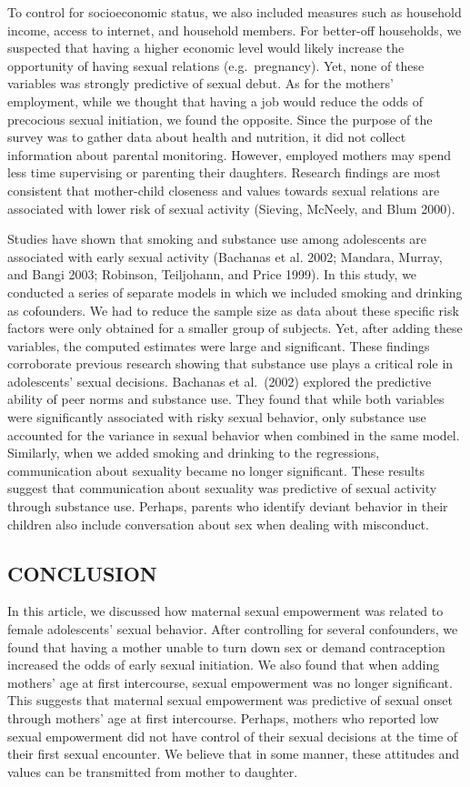 \documentclass[
]{article}
\begin{document}
To control for socioeconomic status, we also included measures such as
household income, access to internet, and household members. For
better-off households, we suspected that having a higher economic level
would likely increase the opportunity of having sexual relations
(e.g.~pregnancy). Yet, none of these variables was strongly predictive
of sexual debut. As for the mothers' employment, while we thought that
having a job would reduce the odds of precocious sexual initiation, we
found the opposite. Since the purpose of the survey was to gather data
about health and nutrition, it did not collect information about
parental monitoring. However, employed mothers may spend less time
supervising or parenting their daughters. Research findings are most
consistent that mother-child closeness and values towards sexual
relations are associated with lower risk of sexual activity (Sieving,
McNeely, and Blum 2000).

Studies have shown that smoking and substance use among adolescents are
associated with early sexual activity (Bachanas et al. 2002; Mandara,
Murray, and Bangi 2003; Robinson, Teiljohann, and Price 1999). In this
study, we conducted a series of separate models in which we included
smoking and drinking as cofounders. We had to reduce the sample size as
data about these specific risk factors were only obtained for a smaller
group of subjects. Yet, after adding these variables, the computed
estimates were large and significant. These findings corroborate
previous research showing that substance use plays a critical role in
adolescents' sexual decisions. Bachanas et al.~(2002) explored the
predictive ability of peer norms and substance use. They found that
while both variables were significantly associated with risky sexual
behavior, only substance use accounted for the variance in sexual
behavior when combined in the same model. Similarly, when we added
smoking and drinking to the regressions, communication about sexuality
became no longer significant. These results suggest that communication
about sexuality was predictive of sexual activity through substance use.
Perhaps, parents who identify deviant behavior in their children also
include conversation about sex when dealing with misconduct.

\hypertarget{conclusion}{%
\subsection{CONCLUSION}\label{conclusion}}

In this article, we discussed how maternal sexual empowerment was
related to female adolescents' sexual behavior. After controlling for
several confounders, we found that having a mother unable to turn down
sex or demand contraception increased the odds of early sexual
initiation. We also found that when adding mothers' age at first
intercourse, sexual empowerment was no longer significant. This suggests
that maternal sexual empowerment was predictive of sexual onset through
mothers' age at first intercourse. Perhaps, mothers who reported low
sexual empowerment did not have control of their sexual decisions at the
time of their first sexual encounter. We believe that in some manner,
these attitudes and values can be transmitted from mother to daughter.
\end{document}
